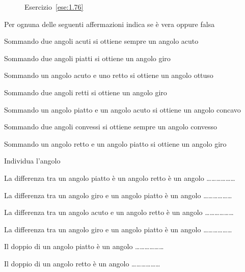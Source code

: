 \begin{inaccessibleblock}
 \begin{figure}[htb]
 \centering
 \caption{Esercizio~\ref{ese:1.76}}\label{fig:ese1.76}
\end{figure}
\end{inaccessibleblock}

\begin{esercizio}
\label{ese:1.77}
Per ognuna delle seguenti affermazioni indica se è vera oppure falsa
\begin{enumeratea}
\item Sommando due angoli acuti si ottiene sempre un angolo 
acuto		\hfill\boxV\quad\boxF
\item Sommando due angoli piatti si ottiene un angolo giro	
			\hfill\boxV\quad\boxF
\item Sommando un angolo acuto e uno retto si ottiene un angolo 
ottuso	\hfill\boxV\quad\boxF
\item Sommando due angoli retti si ottiene un angolo giro	
			\hfill\boxV\quad\boxF
\item Sommando un angolo piatto e un angolo acuto si ottiene un 
angolo concavo	\hfill\boxV\quad\boxF
\item Sommando due angoli convessi si ottiene sempre un angolo 
convesso	\hfill\boxV\quad\boxF
\item Sommando un angolo retto e un angolo piatto si ottiene un 
angolo giro		\hfill\boxV\quad\boxF
\end{enumeratea}
\end{esercizio}

\begin{esercizio}
\label{ese:1.78}
Individua l'angolo
\begin{enumeratea}
\item La differenza tra un angolo piatto è un angolo retto è un 
angolo \ldots\ldots\ldots\ldots\ldots\ldots{}
\item La differenza tra un angolo giro e un angolo piatto è un angolo 
\ldots\ldots\ldots\ldots\ldots\ldots{}
\item La differenza tra un angolo acuto e un angolo retto è un angolo 
\ldots\ldots\ldots\ldots\ldots\ldots{}
\item La differenza tra un angolo giro e un angolo piatto è un angolo 
\ldots\ldots\ldots\ldots\ldots\ldots{}
\item Il doppio di un angolo piatto è un angolo 
\ldots\ldots\ldots\ldots\ldots\ldots{}
\item Il doppio di un angolo retto è un angolo 
\ldots\ldots\ldots\ldots\ldots\ldots{}
\end{enumeratea}
\end{esercizio}
	
